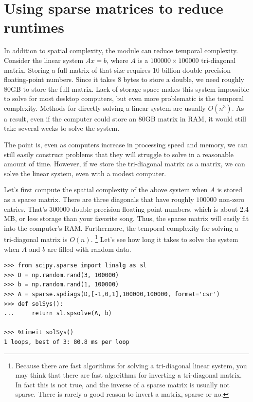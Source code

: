 \section*{Using sparse matrices to reduce runtimes}
In addition to spatial complexity, the  module can reduce temporal complexity. 
Consider the linear system $A x = b$, where $A$ is a $100000\times 100000$ tri-diagonal matrix.
Storing a full matrix of that size requires 10 billion double-precision floating-point numbers. 
Since it takes 8 bytes to store a double, we need roughly 80GB to store the full matrix. 
Lack of storage space makes this system impossible to solve for most desktop computers, but even more problematic is the temporal complexity. 
Methods for directly solving a linear system are usually $O(n^3)$. 
As a result, even if the computer could store an 80GB matrix in RAM, it would still take several weeks to solve the system. 

The point is, even as computers increase in processing speed and memory, we can still easily construct problems that they will struggle to solve in a reasonable amount of time. 
However, if we store the tri-diagonal matrix as a  matrix, we can solve the linear system, even with a modest computer. 

Let's first compute the spatial complexity of the above system when $A$ is stored as a sparse matrix. 
There are three diagonals that have roughly $100000$ non-zero entries. 
That's $300000$ double-precision floating point numbers, which is about 2.4 MB, or less storage than your favorite song. 
Thus, the sparse matrix will easily fit into the computer's RAM. Furthermore, the temporal complexity for solving a tri-diagonal matrix is $O(n)$.
\footnote{Because there are fast algorithms for solving a tri-diagonal linear system, you may think that there are fast algorithms for inverting a tri-diagonal matrix. 
In fact this is not true, and the inverse of a sparse matrix is usually not sparse. 
There is rarely a good reason to invert a matrix, sparse or no.} 
Let's see how long it takes to solve the system when $A$ and $b$ are filled with random data.

\begin{lstlisting}
>>> from scipy.sparse import linalg as sl
>>> D = np.random.rand(3, 100000)
>>> b = np.random.rand(1, 100000)
>>> A = sparse.spdiags(D,[-1,0,1],100000,100000, format='csr')
>>> def solSys():
...     return sl.spsolve(A, b)

>>> %timeit solSys()
1 loops, best of 3: 80.8 ms per loop

\end{lstlisting}

